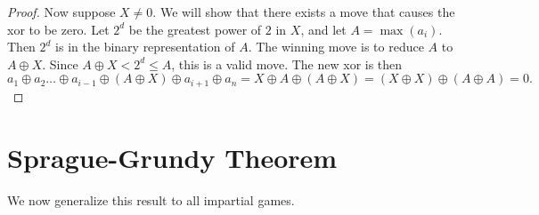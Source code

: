 \documentclass[11pt]{scrartcl}
\begin{document}
\begin{definition}
\begin{proof}
    Now suppose $X \neq 0$.
    We will show that there exists a move that causes the xor to be zero.
    Let $2^d$ be the greatest power of $2$ in $X$, and let $A = \max(a_i)$.
    Then $2^d$ is in the binary representation of $A$.
    The winning move is to reduce $A$ to $A \oplus X$.
    Since $A \oplus X < 2^d \leq A$, this is a valid move.
    The new xor is then
    \[
      a_1 \oplus a_2 \dots \oplus a_{i-1} \oplus (A \oplus X) \oplus a_{i+1} \oplus a_n = X \oplus A \oplus (A \oplus X) = (X \oplus X) \oplus (A \oplus A) = 0.
    \]

  \end{proof}

  \section{Sprague-Grundy Theorem}

  We now generalize this result to all impartial games.


\end{definition}
\end{document}
